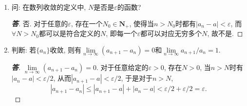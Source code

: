 \documentclass[a4paper,11pt,twoside]{ctexbook}
\begin{document}
\begin{enumerate}
	\item 问: 在数列收敛的定义中, $N$是否是$\varepsilon$的函数?
	      \begin{proof}[\bf 答]
		      否. 对于任意的$\varepsilon$, 存在一个$N_0\in\mathbf{N}_{+}$, 使得当$n>N_0$时都有$|a_n-a|<\varepsilon$, 而$\forall N>N_0$都可以是符合定义的$N$, 即每一个$\varepsilon$都可以对应无穷多个$N$, 故不是.\qedhere
	      \end{proof}
	\item 判断: 若$\{a_n\}$收敛, 则有$\lim\limits_{n\to\infty} (a_{n+1}-a_n)=0$和$\lim\limits_{n\to\infty} a_{n+1}/a_n=1$.
	      \begin{proof}[\bf 答]
		      $\lim\limits_{n\to\infty} (a_{n+1}-a_n)=0$. 对于任意给定的$\varepsilon>0$, 存在$N>0$, 当$n>N$时有$|a_n-a|<\varepsilon/2$, 从而$|a_{n+1}-a|<\varepsilon/2$, 于是对于$n>N$,
		      \[
			      |a_{n+1}-a_n|\leqslant|a_{n+1}-a|+|a_n-a|<\varepsilon/2+\varepsilon/2=\varepsilon.
		      \]


\end{proof}
\end{enumerate}
\end{document}
